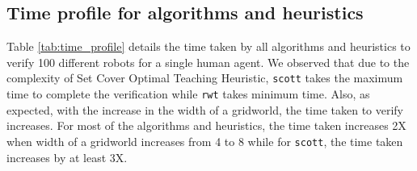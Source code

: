 \subsection{Time profile for algorithms and heuristics}
Table \ref{tab:time_profile} details the time taken by all algorithms and heuristics to verify 100 different robots for a single human agent. We observed that due to the complexity of Set Cover Optimal Teaching Heuristic, \texttt{scott} takes the maximum time to complete the verification while \texttt{rwt} takes minimum time. Also, as expected, with the increase in the width of a gridworld, the time taken to verify increases. For most of the algorithms and heuristics, the time taken increases 2X when width of a gridworld increases from 4 to 8 while for \texttt{scott}, the time taken increases by at least 3X.

